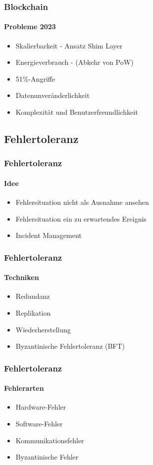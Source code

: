 \begin{frame}
  \frametitle{Blockchain}
  \framesubtitle{Probleme 2023}
 \begin{itemize}
    \item Skalierbarkeit - Ansatz Shim Layer
    \item Energieverbrauch - (Abkehr von PoW)
    \item 51\%-Angriffe
    \item Datenunveränderlichkeit
    \item Komplexität und Benutzerfreundlichkeit
  \end{itemize}    
\end{frame}

\subsection{Fehlertoleranz}
\begin{frame}
  \frametitle{Fehlertoleranz}
  \framesubtitle{Idee}
 \begin{itemize}
    \item Fehlersituation nicht als Ausnahme ansehen
    \item Fehlersituation ein zu erwartendes Ereignis
    \item Incident Management
  \end{itemize}    
\end{frame}

\begin{frame}
  \frametitle{Fehlertoleranz}
  \framesubtitle{Techniken}
 \begin{itemize}
    \item Redundanz
    \item Replikation
    \item Wiederherstellung
    \item Byzantinische Fehlertoleranz (BFT)
  \end{itemize}    
\end{frame}

\begin{frame}
  \frametitle{Fehlertoleranz}
  \framesubtitle{Fehlerarten}
 \begin{itemize}
    \item Hardware-Fehler
    \item Software-Fehler
    \item Kommunikationsfehler
    \item Byzantinische Fehler
  \end{itemize}    
\end{frame}

